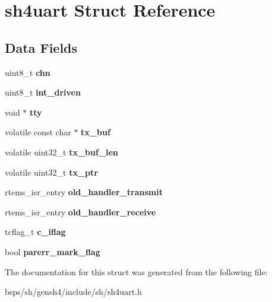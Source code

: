 \hypertarget{structsh4uart}{}\section{sh4uart Struct Reference}
\label{structsh4uart}
\subsection*{Data Fields}
\begin{DoxyCompactItemize}
\item 
\mbox{\label{structsh4uart_aaa29793a136631e3ff88d09ddf9e3e04}} 
uint8\+\_\+t {\bfseries chn}
\item 
\mbox{\label{structsh4uart_a078dc93728a523ebad79fac28ed23ce3}} 
uint8\+\_\+t {\bfseries int\+\_\+driven}
\item 
\mbox{\label{structsh4uart_afe4467916664c33552940b590a963eee}} 
void $\ast$ {\bfseries tty}
\item 
\mbox{\label{structsh4uart_a072cd44a0319e3597b70a5cf0245b12a}} 
volatile const char $\ast$ {\bfseries tx\+\_\+buf}
\item 
\mbox{\label{structsh4uart_a1b62eae7ef7db53dd099b9b2cafd92e4}} 
volatile uint32\+\_\+t {\bfseries tx\+\_\+buf\+\_\+len}
\item 
\mbox{\label{structsh4uart_a6b958446701106e1eb08124de1116281}} 
volatile uint32\+\_\+t {\bfseries tx\+\_\+ptr}
\item 
\mbox{\label{structsh4uart_a3e521fb983a8e3c45793b7cb7ff72a3e}} 
rtems\+\_\+isr\+\_\+entry {\bfseries old\+\_\+handler\+\_\+transmit}
\item 
\mbox{\label{structsh4uart_a1d46af7f3e3991d369bba60585fd4517}} 
rtems\+\_\+isr\+\_\+entry {\bfseries old\+\_\+handler\+\_\+receive}
\item 
\mbox{\label{structsh4uart_a9724a27d0f574890d8ae5be70df3bb19}} 
tcflag\+\_\+t {\bfseries c\+\_\+iflag}
\item 
\mbox{\label{structsh4uart_ae6cfd265c385521a10f39c10775c0f69}} 
bool {\bfseries parerr\+\_\+mark\+\_\+flag}
\end{DoxyCompactItemize}


The documentation for this struct was generated from the following file\+:\begin{DoxyCompactItemize}
\item 
bsps/sh/gensh4/include/sh/sh4uart.\+h\end{DoxyCompactItemize}
